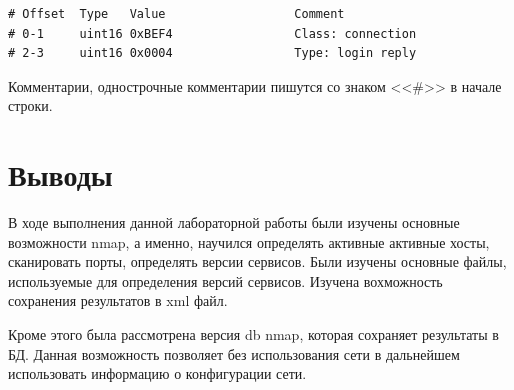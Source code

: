\documentclass[utf8x, 12pt]{G7-32}
\begin{document}
\begin{lstlisting}
# Offset  Type   Value                  Comment
# 0-1     uint16 0xBEF4                 Class: connection
# 2-3     uint16 0x0004                 Type: login reply
\end{lstlisting}

Комментарии, однострочные комментарии пишутся со знаком <<\#>> в начале строки.



\chapter{Выводы}

В ходе выполнения данной лабораторной работы были изучены основные возможности nmap, а именно, научился определять активные активные хосты, сканировать порты, определять версии сервисов. Были изучены основные файлы, используемые для определения версий сервисов. Изучена вохможность сохранения результатов в xml файл.

Кроме этого была рассмотрена версия db nmap, которая сохраняет результаты в БД. Данная возможность позволяет без использования сети в дальнейшем использовать информацию о конфигурации сети.
\end{document}
